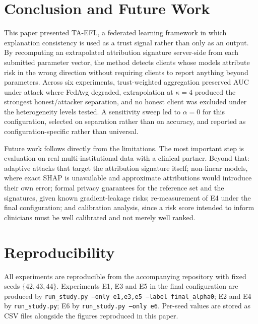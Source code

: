 \documentclass[10pt,twocolumn,letterpaper]{article}
\begin{document}
\section{Conclusion and Future Work}

This paper presented TA-EFL, a federated learning framework in which
explanation consistency is used as a trust signal rather than only as an
output. By recomputing an extrapolated attribution signature server-side from
each submitted parameter vector, the method detects clients whose models
attribute risk in the wrong direction without requiring clients to report
anything beyond parameters. Across six experiments, trust-weighted
aggregation preserved AUC under attack where FedAvg degraded, extrapolation
at $\kappa=4$ produced the strongest honest/attacker separation, and no
honest client was excluded under the heterogeneity levels tested. A
sensitivity sweep led to $\alpha=0$ for this configuration, selected on
separation rather than on accuracy, and reported as configuration-specific
rather than universal.

Future work follows directly from the limitations. The most important step is
evaluation on real multi-institutional data with a clinical partner. Beyond
that: adaptive attacks that target the attribution signature itself; non-linear
models, where exact SHAP is unavailable and approximate attributions would
introduce their own error; formal privacy guarantees for the reference set and
the signatures, given known gradient-leakage risks;
re-measurement of E4 under the final configuration; and calibration analysis,
since a risk score intended to inform clinicians must be well calibrated and
not merely well ranked.

\section*{Reproducibility}

All experiments are reproducible from the accompanying repository with fixed
seeds $\{42,43,44\}$. Experiments E1, E3 and E5 in the final configuration
are produced by \texttt{run\_study.py --only e1,e3,e5 --label final\_alpha0};
E2 and E4 by \texttt{run\_study.py}; E6 by
\texttt{run\_study.py --only e6}. Per-seed values are stored as CSV files
alongside the figures reproduced in this paper.
\end{document}
